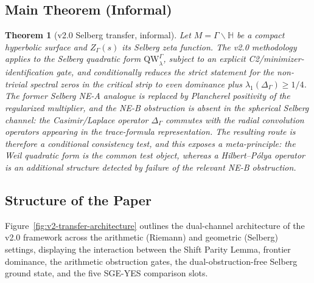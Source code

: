 \documentclass[12pt,a4paper]{article}
\newtheorem{theorem}{Theorem}[section]
\theoremstyle{definition}
\theoremstyle{remark}
\newcommand{\HH}{\mathbb{H}}
\newcommand{\QW}{\mathrm{QW}}
\newcommand{\Sel}{Z_{\Gamma}}
\newcommand{\Delop}{\Delta_{\Gamma}}
\begin{document}
\subsection{Main Theorem (Informal)}

\begin{theorem}[v2.0 Selberg transfer, informal]
\label{thm:main-informal}
Let $M = \Gamma\backslash\HH$ be a compact hyperbolic surface and
$\Sel(s)$ its Selberg zeta function. The v2.0 methodology applies to the
Selberg quadratic form $\QW^\Gamma_\lambda$, subject to an explicit
C2/minimizer-identification gate, and conditionally reduces the strict
statement for the non-trivial spectral zeros in the critical strip to even dominance plus
$\lambda_1(\Delop)\ge 1/4$. The former Selberg NE-A analogue is replaced by
Plancherel positivity of the regularized multiplier, and the NE-B obstruction
is absent in the spherical Selberg channel: the
Casimir/Laplace operator $\Delop$ commutes with the radial convolution
operators appearing in the trace-formula representation. The resulting
route is therefore a conditional consistency test, and this exposes a
meta-principle: the Weil quadratic form is the common test object, whereas a
Hilbert--Pólya operator is an additional structure detected by failure of
the relevant NE-B obstruction.
\end{theorem}

\subsection{Structure of the Paper}

Figure~\ref{fig:v2-transfer-architecture} outlines the dual-channel architecture
of the v2.0 framework across the arithmetic (Riemann) and geometric (Selberg)
settings, displaying the interaction between the Shift Parity Lemma, frontier
dominance, the arithmetic obstruction gates, the dual-obstruction-free Selberg
ground state, and the five SGE-YES comparison slots.
\end{document}
